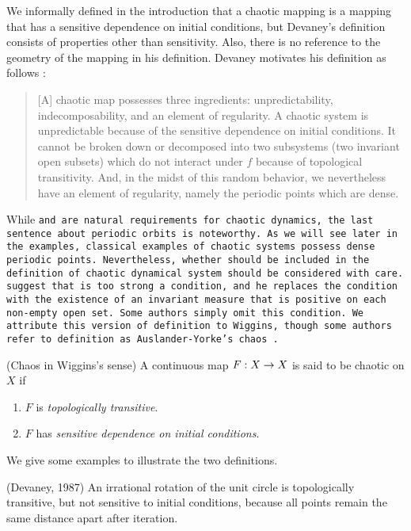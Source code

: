 \documentclass[12pt,draft,twoside]{book}
\begin{document}
We informally defined in the introduction that a chaotic mapping is a mapping that has a sensitive dependence on initial conditions, but Devaney's definition consists of properties other than sensitivity.
Also, there is no reference to the geometry of the mapping in his definition.
Devaney motivates his definition as follows \citep[p.50]{devaney}:
\begin{quotation}
  [A] chaotic map possesses three ingredients:
  unpredictability, indecomposability, and an element of regularity.
  A chaotic system is unpredictable because of the sensitive dependence on initial conditions.
  It cannot be broken down or decomposed into two subsystems (two invariant open subsets) which do not interact under $f$ because of topological transitivity.
  And, in the midst of this random behavior, we nevertheless have an element of regularity, namely the periodic points which are dense.
\end{quotation}
While \tt and \sdic are natural requirements for chaotic dynamics, the last sentence about periodic orbits is noteworthy.
As we will see later in the examples, classical examples of chaotic systems possess dense periodic points.
Nevertheless, whether \dpp should be included in the definition of chaotic dynamical system should be considered with care.
\citet{glasner} suggest that \dpp is too strong a condition, and he replaces the condition with the existence of an invariant measure that is positive on each non-empty open set. 
Some authors simply omit this condition.
We attribute this version of definition to Wiggins, though some authors refer to definition as Auslander-Yorke's chaos \citep{blanchard}.
\begin{definition}
  (Chaos in Wiggins's sense)
  A continuous map $F: X\rightarrow X$ is said to be chaotic on $X$ if
  \begin{enumerate}
    \item $F$ is \textit{topologically transitive}.
    \item $F$ has \textit{sensitive dependence on initial conditions}.
  \end{enumerate}
\end{definition}
We give some examples to illustrate the two definitions.
  \begin{example}
    (Devaney, 1987)
    An irrational rotation of the unit circle is topologically transitive, but not sensitive to initial conditions, because all points remain the same distance apart after iteration.
  \end{example}
\end{document}
